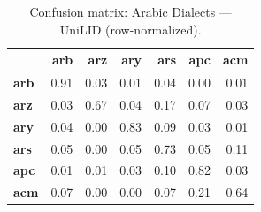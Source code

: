 \begin{table}[htbp]
\centering
\small
\begin{tabular}{lrrrrrr}
\toprule
 & \textbf{arb} & \textbf{arz} & \textbf{ary} & \textbf{ars} & \textbf{apc} & \textbf{acm} \\
\midrule
\textbf{arb} & \cellcolor{blue!91}\color{white}0.91 & \cellcolor{blue!2}0.03 & \cellcolor{blue!1}0.01 & \cellcolor{blue!3}0.04 & \cellcolor{blue!0}0.00 & \cellcolor{blue!0}0.01 \\
\textbf{arz} & \cellcolor{blue!2}0.03 & \cellcolor{blue!66}\color{white}0.67 & \cellcolor{blue!3}0.04 & \cellcolor{blue!16}0.17 & \cellcolor{blue!7}0.07 & \cellcolor{blue!3}0.03 \\
\textbf{ary} & \cellcolor{blue!3}0.04 & \cellcolor{blue!0}0.00 & \cellcolor{blue!83}\color{white}0.83 & \cellcolor{blue!9}0.09 & \cellcolor{blue!2}0.03 & \cellcolor{blue!1}0.01 \\
\textbf{ars} & \cellcolor{blue!5}0.05 & \cellcolor{blue!0}0.00 & \cellcolor{blue!5}0.05 & \cellcolor{blue!72}\color{white}0.73 & \cellcolor{blue!5}0.05 & \cellcolor{blue!10}0.11 \\
\textbf{apc} & \cellcolor{blue!1}0.01 & \cellcolor{blue!0}0.01 & \cellcolor{blue!3}0.03 & \cellcolor{blue!10}0.10 & \cellcolor{blue!82}\color{white}0.82 & \cellcolor{blue!2}0.03 \\
\textbf{acm} & \cellcolor{blue!7}0.07 & \cellcolor{blue!0}0.00 & \cellcolor{blue!0}0.00 & \cellcolor{blue!7}0.07 & \cellcolor{blue!21}0.21 & \cellcolor{blue!64}\color{white}0.64 \\
\bottomrule
\end{tabular}
\caption{Confusion matrix: Arabic Dialects — UniLID (row-normalized).}
\label{tab:cm-arabic_dialects-unilid}
\end{table}

